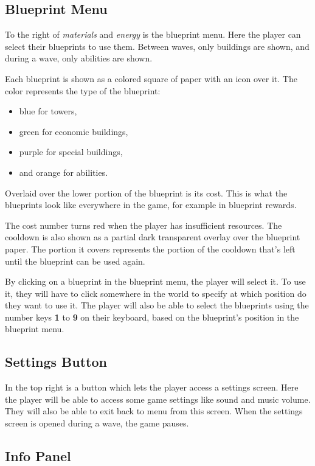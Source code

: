 \subsection{Blueprint Menu}

To the right of \emph{materials} and \emph{energy} is the blueprint menu.
Here the player can select their blueprints to use them.
Between waves, only buildings are shown, and during a wave, only abilities are shown.

Each blueprint is shown as a colored square of paper with an icon over it.
The color represents the type of the blueprint:
\begin{itemize}
    \item blue for towers,
    \item green for economic buildings,
    \item purple for special buildings,
    \item and orange for abilities.
\end{itemize}
Overlaid over the lower portion of the blueprint is its cost.
This is what the blueprints look like everywhere in the game, for example in blueprint rewards.

The cost number turns red when the player has insufficient resources.
The cooldown is also shown as a partial dark transparent overlay over the blueprint paper.
The portion it covers represents the portion of the cooldown that's left until the blueprint can be used again.

By clicking on a blueprint in the blueprint menu, the player will select it.
To use it, they will have to click somewhere in the world to specify at which position do they want to use it.
The player will also be able to select the blueprints using the number keys \textbf{1} to \textbf{9} on their keyboard, based on the blueprint's position in the blueprint menu.

\subsection{Settings Button}

In the top right is a button which lets the player access a settings screen.
Here the player will be able to access some game settings like sound and music volume.
They will also be able to exit back to menu from this screen.
When the settings screen is opened during a wave, the game pauses.

\subsection{Info Panel}\label{sec:design-info-panel}

